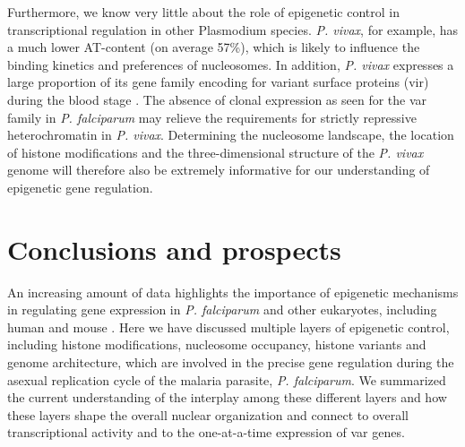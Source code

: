 Furthermore, we know very little about the role of epigenetic control in
transcriptional regulation in other Plasmodium species. \textit{P. vivax}, for example,
has a much lower AT-content (on average 57\%), which is likely to influence the
binding kinetics and preferences of nucleosomes. In addition, \textit{P.
vivax}
expresses a large proportion of its gene family encoding for variant surface
proteins (vir) during the blood stage \citep{bozdech:transcriptome,
fernandez-becerra:variant}. The absence of clonal
expression as seen for the var family in \textit{P. falciparum} may relieve the
requirements for strictly repressive heterochromatin in \textit{P. vivax}. Determining
the nucleosome landscape, the location of histone modifications and the
three-dimensional structure of the \textit{P. vivax} genome will therefore also be
extremely informative for our understanding of epigenetic gene regulation.


\section{Conclusions and prospects}
An increasing amount of data highlights the importance of epigenetic
mechanisms in regulating gene expression in \textit{P. falciparum} and other
eukaryotes, including human and mouse \citep{ay:three-dimensional,
dixon:topological, duan:three, lemieux:genome-wide,
lieberman-aiden:comprehensive, sexton:three-dimensional}.
Here we have discussed multiple
layers of epigenetic control, including histone modifications, nucleosome
occupancy, histone variants and genome architecture, which are involved in the
precise gene regulation during the asexual replication cycle of the malaria
parasite, \textit{P. falciparum}. We summarized the current understanding of the
interplay among these different layers and how these layers shape the overall
nuclear organization and connect to overall transcriptional activity and to
the one-at-a-time expression of var genes.

